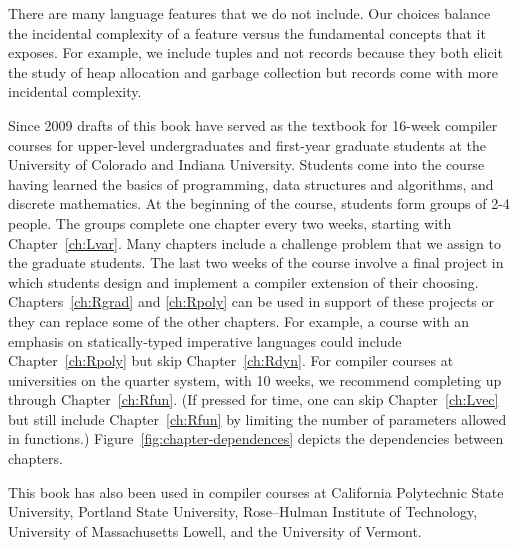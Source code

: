 \documentclass[7x10]{TimesAPriori_MIT}%
\begin{document}
There are many language features that we do not include. Our choices
balance the incidental complexity of a feature versus the fundamental
concepts that it exposes. For example, we include tuples and not
records because they both elicit the study of heap allocation and
garbage collection but records come with more incidental complexity.

Since 2009 drafts of this book have served as the textbook for 16-week
compiler courses for upper-level undergraduates and first-year
graduate students at the University of Colorado and Indiana
University.
%
Students come into the course having learned the basics of
programming, data structures and algorithms, and discrete
mathematics.
%
At the beginning of the course, students form groups of 2-4 people.
The groups complete one chapter every two weeks, starting with
Chapter~\ref{ch:Lvar}. Many chapters include a challenge problem that
we assign to the graduate students. The last two weeks of the course
involve a final project in which students design and implement a
compiler extension of their choosing.  Chapters~\ref{ch:Rgrad} and
\ref{ch:Rpoly} can be used in support of these projects or they can
replace some of the other chapters. For example, a course with an
emphasis on statically-typed imperative languages could include
Chapter~\ref{ch:Rpoly} but skip Chapter~\ref{ch:Rdyn}. For compiler
courses at universities on the quarter system, with 10 weeks, we
recommend completing up through Chapter~\ref{ch:Rfun}.  (If pressed
for time, one can skip Chapter~\ref{ch:Lvec} but still include
Chapter~\ref{ch:Rfun} by limiting the number of parameters allowed in
functions.)  Figure~\ref{fig:chapter-dependences} depicts the
dependencies between chapters.

This book has also been used in compiler courses at California
Polytechnic State University, Portland State University, Rose–Hulman
Institute of Technology, University of Massachusetts Lowell, and the
University of Vermont.
\end{document}
